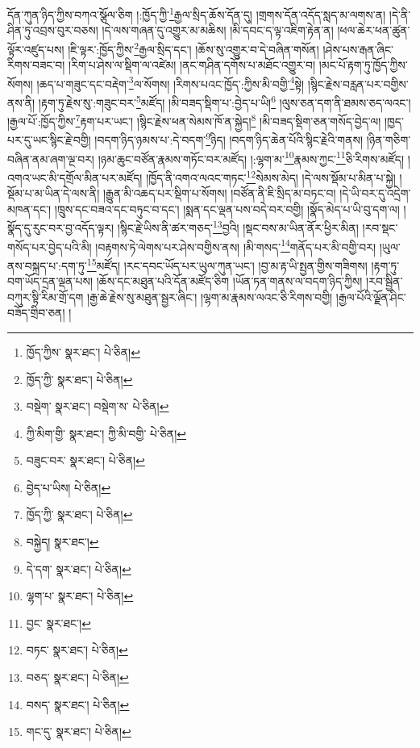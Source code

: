 དོན་ཀུན་ཉིད་ཀྱིས་བཀའ་སྩོལ་ཅིག །:ཁྱོད་ཀྱི་\footnote{ཁྱོད་ཀྱིས་  སྣར་ཐང་།  པེ་ཅིན། }རྒྱལ་སྲིད་ཆོས་དོན་དུ། །གྲགས་དོན་འདོད་སླད་མ་ལགས་ན། །དེ་ནི་ཤིན་ཏུ་འབྲས་བུར་བཅས། །དེ་ལས་གཞན་དུ་འགྱུར་མ་མཆིས། །མི་དབང་ད་ལྟ་འཇིག་རྟེན་ན། །ཕལ་ཆེར་ཕན་ཚུན་ལྟོར་འཛུད་པས། །ཇི་ལྟར་:ཁྱོད་ཀྱིས་\footnote{ཁྱོད་ཀྱི་  སྣར་ཐང་།  པེ་ཅིན། }རྒྱལ་སྲིད་དང་། །ཆོས་སུ་འགྱུར་བ་དེ་བཞིན་གསོན། །ཤེས་པས་རྒན་ཞིང་རིགས་བཟང་བ། །རིག་པ་ཤེས་ལ་སྡིག་ལ་འཛེམ། །ནང་གཤིན་དགོས་པ་མཐོང་འགྱུར་བ། །མང་པོ་རྟག་ཏུ་ཁྱོད་ཀྱིས་སོགས། །ཆད་པ་གཟུང་དང་བརྡེག་\footnote{བསྡེག་  སྣར་ཐང་། བསྡེག་ས་  པེ་ཅིན། }ལ་སོགས། །རིགས་པའང་ཁྱོད་:ཀྱིས་མི་བགྱི་\footnote{ཀྱི་མིག་གྱི་  སྣར་ཐང་། ཀྱི་མི་བགྱི་  པེ་ཅིན། }སྟེ། །སྙིང་རྗེས་བརླན་པར་བགྱིས་ནས་ནི། །རྟག་ཏུ་རྗེས་སུ་:གཟུང་བར་\footnote{བཟུང་བར་  སྣར་ཐང་།  པེ་ཅིན། }མཛོད། །མི་བཟད་སྡིག་པ་:བྱེད་པ་ཡི།\footnote{བྱེད་པ་ཡིས།  པེ་ཅིན། } །ལུས་ཅན་དག་ནི་ཐམས་ཅད་ལའང་། །རྒྱལ་པོ་:ཁྱོད་ཀྱིས་\footnote{ཁྱོད་ཀྱི་  སྣར་ཐང་།  པེ་ཅིན། }རྟག་པར་ཡང་། །སྙིང་རྗེས་ཕན་སེམས་ཁོ་ན་སྐྱེད།\footnote{བསྐྱེད།  སྣར་ཐང་། } །མི་བཟད་སྡིག་ཅན་གསོད་བྱེད་ལ། །ཁྱད་པར་དུ་ཡང་སྙིང་རྗེ་བགྱི། །བདག་ཉིད་ཉམས་པ་:དེ་བདག་\footnote{དེ་དག་  སྣར་ཐང་།  པེ་ཅིན། }ཉིད། །བདག་ཉིད་ཆེན་པོའི་སྙིང་རྗེའི་གནས། །ཉིན་གཅིག་བཞིན་ནམ་ཞག་ལྔ་བར། །ཉམ་ཆུང་བཙོན་རྣམས་གཏོང་བར་མཛོད། །:ལྷག་མ་\footnote{ལྷག་པ་  སྣར་ཐང་།  པེ་ཅིན། }རྣམས་ཀྱང་\footnote{བྱང་  སྣར་ཐང་། }ཅི་རིགས་མཛོད། །འགའ་ཡང་མི་དགྲོལ་མིན་པར་མཛོད། །ཁྱོད་ནི་འགའ་ལའང་གཏང་\footnote{བཏང་  སྣར་ཐང་།  པེ་ཅིན། }སེམས་མེད། །དེ་ལས་སྡོམ་པ་མིན་པ་སྐྱེ། །སྡོམ་པ་མ་ཡིན་དེ་ལས་ནི། །རྒྱུན་མི་འཆད་པར་སྡིག་པ་སོགས། །བཙོན་ནི་ཇི་སྲིད་མ་བཏང་བ། །དེ་ཡི་བར་དུ་འདྲེག་མཁན་དང་། །ཁྲུས་དང་བཟའ་དང་བཏུང་བ་དང་། །སྨན་དང་ལྡན་པས་བདེ་བར་བགྱི། །སྣོད་མེད་པ་ཡི་བུ་དག་ལ། །སྣོད་དུ་རུང་བར་བྱ་འདོད་ལྟར། །སྙིང་རྗེ་ཡིས་ནི་ཚར་གཅད་\footnote{བཅད་  སྣར་ཐང་།  པེ་ཅིན། }བྱའི། །སྡང་བས་མ་ཡིན་ནོར་ཕྱིར་མིན། །རབ་སྡང་གསོད་པར་བྱེད་པའི་མི། །བརྟགས་ཏེ་ལེགས་པར་ཤེས་བགྱིས་ནས། །མི་གསད་\footnote{བསད་  སྣར་ཐང་།  པེ་ཅིན། }གནོད་པར་མི་བགྱི་བར། །ཡུལ་ནས་བསྐྲད་པ་:དག་ཏུ་\footnote{གང་དུ་  སྣར་ཐང་།  པེ་ཅིན། }མཛོད། །རང་དབང་ཡོད་པར་ཡུལ་ཀུན་ཡང་། །བྱ་མ་རྟ་ཡི་སྤྱན་གྱིས་གཟིགས། །རྟག་ཏུ་བག་ཡོད་དྲན་ལྡན་པས། །ཆོས་དང་མཐུན་པའི་དོན་མཛོད་ཅིག །ཡོན་ཏན་གནས་ལ་བདག་ཉིད་ཀྱིས། །རབ་སྦྱིན་བཀུར་སྟི་རིམ་གྲོ་དག །རྒྱ་ཆེ་རྗེས་སུ་མཐུན་སྦྱར་ཞིང་། །ལྷག་མ་རྣམས་ལའང་ཅི་རིགས་བགྱི། །རྒྱལ་པོའི་ལྗོན་ཤིང་བཟོད་གྲིབ་ཅན། །
